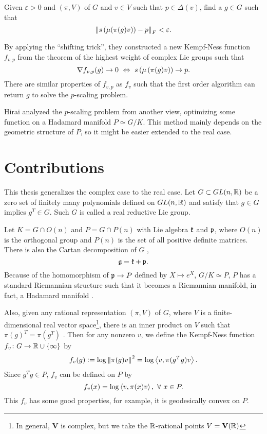 \documentclass[suri,pdfbookmark]{engsuribt} %
\begin{document}
  \begin{prob}
    Given $\varepsilon > 0$ and $(\pi,V)$ of $G$ and $v \in V$ such that $p \in \Delta(v)$, find a $g \in G$ such that
    \begin{equation*}
      \left\lVert s\left(\mu(\pi(g)v)\right)-p\right\lVert_{F} < \varepsilon.
    \end{equation*}
  \end{prob}
  By applying the ``shifting trick'', they constructed a new Kempf-Ness function $f_{v,p}$ from the theorem of the highest weight of complex Lie groups such that
  \begin{equation*}
    \nabla f_{v,p}(g) \rightarrow 0 ~\Leftrightarrow~ s\left(\mu\left(\pi(g)v\right)\right) \rightarrow p.
  \end{equation*}
  There are similar properties of $f_{v,p}$ as $f_v$ such that the first order algorithm can return $g$ to solve the $p$-scaling problem.

  Hirai \cite{key12} analyzed the $p$-scaling problem from another view, optimizing some function on a Hadamard manifold $P \simeq G/K$. This method mainly depends on the geometric structure of $P$, so it might be easier extended to the real case.

  \section{Contributions}

  This thesis generalizes the complex case to the real case. Let $G \subset GL(n,\mathbb{R})$ be a zero set of finitely many polynomials defined on $GL(n,\mathbb{R})$ and satisfy that $g \in G$ implies $g^T \in G$. Such $G$ is called a real reductive Lie group. 

  Let $K = G \cap O(n)$ and $P = G \cap P(n)$ with Lie algebra $\mathfrak{k}$ and $\mathfrak{p}$, where $O(n)$ is the orthogonal group and $P(n)$ is the set of all positive definite matrices. There is also the Cartan decomposition of $G$ \cite{key5}, 
  \begin{equation*}
    \mathfrak{g} = \mathfrak{k} + \mathfrak{p}.
  \end{equation*}
  Because of the homomorphism of $\mathfrak{p} \rightarrow P$ defined by $X \mapsto e^X$, $G/K \simeq P$, $P$ has a standard Riemannian structure such that it becomes a Riemannian manifold, in fact, a Hadamard manifold \cite{key24}.

  Also, given any rational representation $(\pi,V)$ of $G$, where $V$ is a finite-dimensional real vector space\footnote{In general, $\mathbf{V}$ is complex, but we take the $\mathbb{R}$-rational points $V=\mathbf{V}(\mathbb{R})$}, there is an inner product on $V$ such that $\pi(g)^T = \pi(g^T)$ \cite{key16}. Then for any nonzero $v$, we define the Kempf-Ness function $f_v \colon G \rightarrow \mathbb{R}\cup \left\{\infty\right\}$ by
  \begin{equation*}
    f_v(g) \vcentcolon= \log \left\lVert\pi(g)v\right\lVert^2 = \log \left\langle v,\pi(g^Tg)v \right\rangle.
  \end{equation*}
  Since $g^Tg \in P$, $f_v$ can be defined on $P$ by
  \begin{equation*}
    f_v(x) = \log \left\langle v,\pi(x)v \right\rangle,~\forall~x \in P.
  \end{equation*}
  This $f_v$ has some good properties, for example, it is geodesically convex on $P$.
\end{document}
